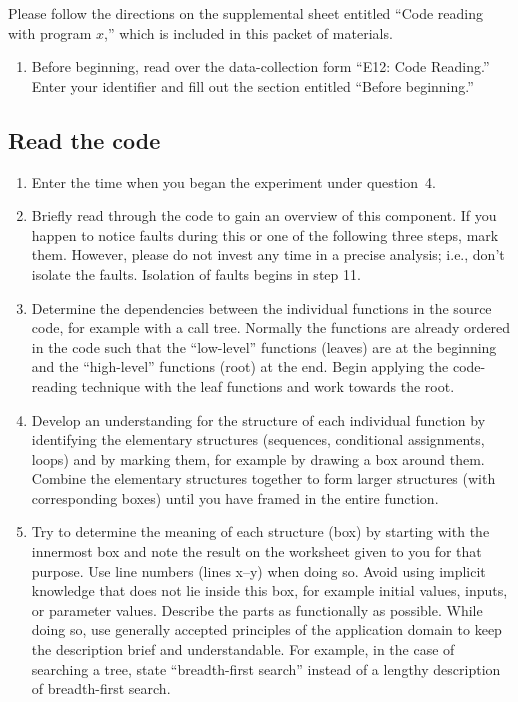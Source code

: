 Please follow the directions on the supplemental sheet entitled ``Code
reading with program $x$,'' which is included in this packet of materials.

\begin{enumerate}

\item Before beginning, read over the data-collection form ``E12: Code Reading.'' 
Enter your identifier and fill out the section entitled ``Before beginning.''

\end{enumerate}

\subsection*{Read the code}

\begin{enumerate}
\addtocounter{enumi}{1}

\item Enter the time when you began the experiment under question~4.

\item Briefly read through the code to gain an overview of this component.  
If you happen to notice faults during this or one of the following
three steps, mark  them.  However, please do not invest any time in a
precise analysis; i.e., don't isolate the faults.  Isolation of faults
begins in step 11. 

\item Determine the dependencies between the individual functions in
the source code, for example with a call tree.
Normally the functions are already ordered in the code such that the
``low-level'' functions (leaves) are at the beginning and the
``high-level'' functions (root) at the end.
Begin applying the code-reading technique with the leaf functions and
work towards the root.

\item Develop an understanding for the structure of each individual
function by identifying the elementary structures (sequences,
conditional assignments, loops) and by marking them, for example by
drawing a box around them. 
Combine the elementary structures together to form larger structures
(with corresponding boxes) until you have framed in the entire
function. 

\item Try to determine the meaning of each structure (box) by starting
with the innermost box and note the result on the worksheet given to
you for that purpose.
Use line numbers (lines x--y) when doing so.
Avoid using implicit knowledge that does not lie inside this box, for
example initial values, inputs, or parameter values.
Describe the parts as functionally as possible.
While doing so, use generally accepted principles of the application
domain to keep the description brief and understandable.  For example,
in the case of searching a tree, state ``breadth-first search'' instead
of a lengthy description of breadth-first search.


\end{enumerate}
